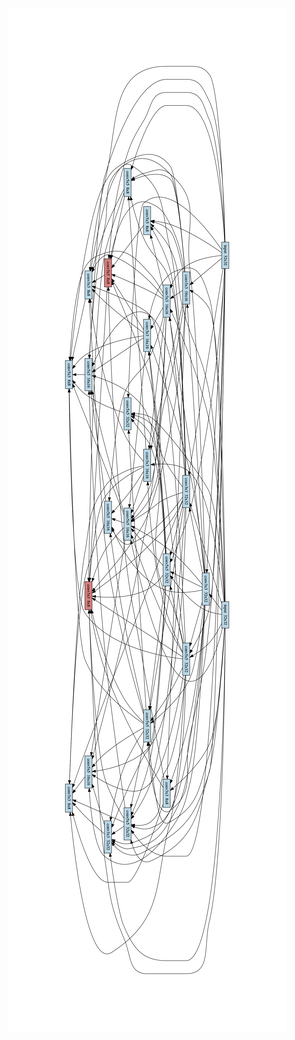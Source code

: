 \begin{figure}[h]
\iflatexml
\includegraphics[width=6\linewidth]{figures/graph_642261663860860599_cell_0.png}

\end{figure}
